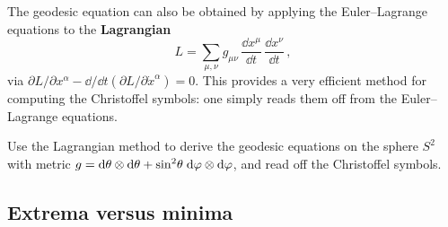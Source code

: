 \begin{keyresult}
  The geodesic equation can also be obtained by applying
  the Euler--Lagrange equations to the \textbf{Lagrangian}
  \begin{equation}\label{eq:geodesic-lagrangian}
    L = \sum_{\mu,\nu}
      g_{\mu\nu}\,\frac{\dd x^\mu}{\dd t}\,
        \frac{\dd x^\nu}{\dd t}\,,
  \end{equation}
  via $\partial L/\partial x^\alpha
    - \dd/\dd t(\partial L/\partial\dot{x}^\alpha) = 0$.
  This provides a very efficient method for computing the
  Christoffel symbols: one simply reads them off from the
  Euler--Lagrange equations.
\end{keyresult}

\begin{exercise}\label{ex:geodesic-lagrangian-sphere}
  Use the Lagrangian method to derive the geodesic equations on
  the sphere $S^2$ with metric
  $g = \mathrm{d}\theta\otimes\mathrm{d}\theta
    + \sin^2\!\theta\;\mathrm{d}\varphi\otimes\mathrm{d}\varphi$,
  and read off the Christoffel symbols.
\end{exercise}

\subsection{Extrema versus minima}\label{sec:extrema-vs-minima}

